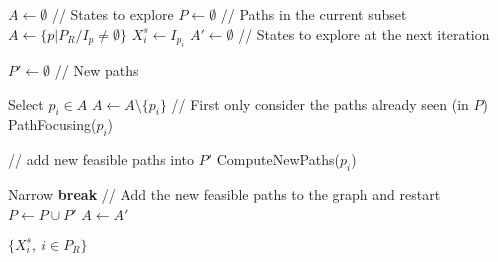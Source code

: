 \STATE $A \gets \emptyset$ // States to explore
\STATE $P \gets \emptyset$ // Paths in the current subset
\STATE $A \gets \{p | P_R / I_p \neq \emptyset\}$
	\STATE $X_i^s \gets I_{p_i}$ \label{alg=X-init}
\ENDFOR 
{}
\STATE $A' \gets \emptyset$ // States to explore at the next iteration

\STATE $P' \gets \emptyset$ // New paths

 \label{alg=start-ascending}
	\STATE Select $p_i \in A$
	\STATE $A \gets A \setminus \{p_i\}$
	\STATE // First only consider the paths already seen (in $P$)
	\STATE PathFocusing($p_i$) \label{alg=pf}
	
	\STATE // add new feasible paths into $P'$
	\STATE ComputeNewPaths($p_i$) \label{alg=computeNewPaths}

\ENDWHILE \label{alg=end-ascending}
\STATE Narrow \label{alg=narrowing}
	\STATE \textbf{break}
\ENDIF 
\STATE // Add the new feasible paths to the graph and restart  \label{alg=start-add-paths}
\STATE $P \gets P \cup P'$
\STATE $A \gets A'$ \label{alg=end-add-paths}
\ENDWHILE

\STATE \RETURN $\{X_i^s,\ i \in P_R\}$

